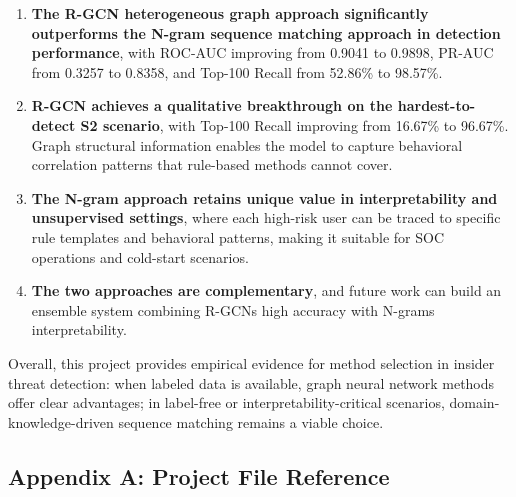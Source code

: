 \documentclass[
  a4paper,
  11pt]{article}
\begin{document}
\begin{enumerate}
\def\labelenumi{\arabic{enumi}.}
\item
  \textbf{The R-GCN heterogeneous graph approach significantly
  outperforms the N-gram sequence matching approach in detection
  performance}, with ROC-AUC improving from 0.9041 to 0.9898, PR-AUC
  from 0.3257 to 0.8358, and Top-100 Recall from 52.86\% to 98.57\%.
\item
  \textbf{R-GCN achieves a qualitative breakthrough on the
  hardest-to-detect S2 scenario}, with Top-100 Recall improving from
  16.67\% to 96.67\%. Graph structural information enables the model to
  capture behavioral correlation patterns that rule-based methods cannot
  cover.
\item
  \textbf{The N-gram approach retains unique value in interpretability
  and unsupervised settings}, where each high-risk user can be traced to
  specific rule templates and behavioral patterns, making it suitable
  for SOC operations and cold-start scenarios.
\item
  \textbf{The two approaches are complementary}, and future work can
  build an ensemble system combining R-GCN\textquotesingle s high
  accuracy with N-gram\textquotesingle s interpretability.
\end{enumerate}

Overall, this project provides empirical evidence for method selection
in insider threat detection: when labeled data is available, graph
neural network methods offer clear advantages; in label-free or
interpretability-critical scenarios, domain-knowledge-driven sequence
matching remains a viable choice.

\subsection{Appendix A: Project File
Reference}\label{appendix-a-project-file-reference}
\end{document}
